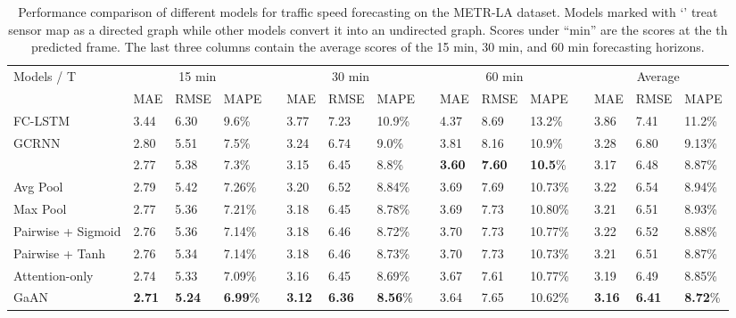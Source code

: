\documentclass{article}
\begin{document}
	
	\begin{table*}[tb!]
		\centering
		\caption{Performance comparison of different models for traffic speed forecasting on the METR-LA dataset. Models marked with `' treat sensor map as a directed graph while other models convert it into an undirected graph. Scores under ``min'' are the scores at the th predicted frame. The last three columns contain the average scores of the 15 min, 30 min, and 60 min forecasting horizons.} \vskip -0.1in
		\begin{tabular}{l m{0.55cm}m{0.55cm}m{0.65cm} p{0.01cm} m{0.55cm}m{0.55cm}m{0.65cm} p{0.01cm} m{0.55cm}m{0.55cm}m{0.65cm} p{0.01cm} m{0.55cm}m{0.55cm}m{0.65cm}}
			\hline 
			\multirow{2}{*}{Models / T}   & \multicolumn{3}{c}{15 min} && \multicolumn{3}{c}{30 min}  && \multicolumn{3}{c}{60 min} && \multicolumn{3}{c}{Average}\\
			\cline{2-4}  \cline{6-8} \cline{10-12}  \cline{14-16}  
			& {\small MAE} & {\small RMSE} & {\small MAPE} && {\small MAE} & {\small RMSE} & {\small MAPE} && {\small MAE} & {\small RMSE} & {\small MAPE} && {\small MAE} & {\small RMSE} & {\small MAPE}\\
			\hline \hline
			FC-LSTM~{\tiny \citep{li2017graph}} & 3.44 & 6.30 & 9.6\% && 3.77 & 7.23 & 10.9\%&& 4.37 & 8.69 & 13.2\% && 3.86& 7.41& 11.2\%\\
			GCRNN~{\tiny \citep{li2017graph}}  & 2.80 & 5.51 & 7.5\% && 3.24 & 6.74 & 9.0\% && 3.81 & 8.16 & 10.9\% && 3.28 & 6.80 & 9.13\% \\
			~{\tiny \citep{li2017graph}}  & 2.77 & 5.38 & 7.3\% && 3.15 & 6.45 & 8.8\% && \textbf{3.60} & \textbf{7.60} & \textbf{10.5}\% && 3.17 & 6.48& 8.87\%\\ \hline
			Avg Pool & 2.79 & 5.42 & 7.26\% && 3.20 & 6.52 & 8.84\% && 3.69 & 7.69 & 10.73\% && 3.22 & 6.54 & 8.94\% \\
			Max Pool & 2.77 & 5.36 & 7.21\% && 3.18 & 6.45 & 8.78\% && 3.69 & 7.73 & 10.80\% && 3.21 & 6.51 & 8.93\%\\
			Pairwise + Sigmoid & 2.76 & 5.36 & 7.14\% && 3.18 & 6.46 & 8.72\% && 3.70 & 7.73 & 10.77\% && 3.22 & 6.52 & 8.88\%\\
			Pairwise + Tanh & 2.76 & 5.34 & 7.14\% && 3.18 & 6.46 & 8.73\% && 3.70 & 7.73 & 10.73\% && 3.21 & 6.51 & 8.87\%\\
			Attention-only      & 2.74 & 5.33 & 7.09\% && 3.16 & 6.45 & 8.69\% && 3.67 & 7.61 & 10.77\% && 3.19 & 6.49 & 8.85\% \\
			GaAN      & \textbf{2.71} & \textbf{5.24} & \textbf{6.99}\% && \textbf{3.12} & \textbf{6.36} & \textbf{8.56}\% && 3.64 & 7.65 & 10.62\% && \textbf{3.16} & \textbf{6.41} & \textbf{8.72}\% \\
			\hline
		\end{tabular}
		\label{table:result_traffic_speed}
	\end{table*}
	
\end{document}

